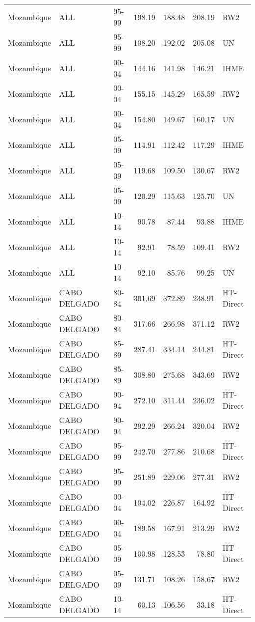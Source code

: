 \begin{longtable}{lllrrrl}
  Mozambique & ALL & 95-99 & 198.19 & 188.48 & 208.19 & RW2 \\ 
  Mozambique & ALL & 95-99 & 198.20 & 192.02 & 205.08 & UN \\ 
  Mozambique & ALL & 00-04 & 144.16 & 141.98 & 146.21 & IHME \\ 
  Mozambique & ALL & 00-04 & 155.15 & 145.29 & 165.59 & RW2 \\ 
  Mozambique & ALL & 00-04 & 154.80 & 149.67 & 160.17 & UN \\ 
  Mozambique & ALL & 05-09 & 114.91 & 112.42 & 117.29 & IHME \\ 
  Mozambique & ALL & 05-09 & 119.68 & 109.50 & 130.67 & RW2 \\ 
  Mozambique & ALL & 05-09 & 120.29 & 115.63 & 125.70 & UN \\ 
  Mozambique & ALL & 10-14 & 90.78 & 87.44 & 93.88 & IHME \\ 
  Mozambique & ALL & 10-14 & 92.91 & 78.59 & 109.41 & RW2 \\ 
  Mozambique & ALL & 10-14 & 92.10 & 85.76 & 99.25 & UN \\ 
  Mozambique & CABO DELGADO & 80-84 & 301.69 & 372.89 & 238.91 & HT-Direct \\ 
  Mozambique & CABO DELGADO & 80-84 & 317.66 & 266.98 & 371.12 & RW2 \\ 
  Mozambique & CABO DELGADO & 85-89 & 287.41 & 334.14 & 244.81 & HT-Direct \\ 
  Mozambique & CABO DELGADO & 85-89 & 308.80 & 275.68 & 343.69 & RW2 \\ 
  Mozambique & CABO DELGADO & 90-94 & 272.10 & 311.44 & 236.02 & HT-Direct \\ 
  Mozambique & CABO DELGADO & 90-94 & 292.29 & 266.24 & 320.04 & RW2 \\ 
  Mozambique & CABO DELGADO & 95-99 & 242.70 & 277.86 & 210.68 & HT-Direct \\ 
  Mozambique & CABO DELGADO & 95-99 & 251.89 & 229.06 & 277.31 & RW2 \\ 
  Mozambique & CABO DELGADO & 00-04 & 194.02 & 226.87 & 164.92 & HT-Direct \\ 
  Mozambique & CABO DELGADO & 00-04 & 189.58 & 167.91 & 213.29 & RW2 \\ 
  Mozambique & CABO DELGADO & 05-09 & 100.98 & 128.53 & 78.80 & HT-Direct \\ 
  Mozambique & CABO DELGADO & 05-09 & 131.71 & 108.26 & 158.67 & RW2 \\ 
  Mozambique & CABO DELGADO & 10-14 & 60.13 & 106.56 & 33.18 & HT-Direct \\ 

\end{longtable}
